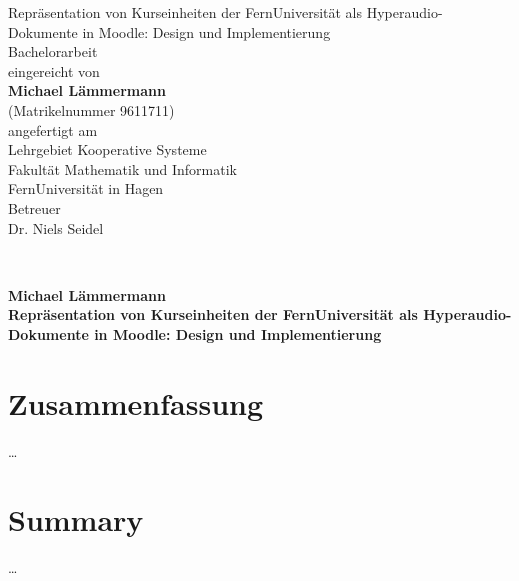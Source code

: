 \documentclass[twoside,bibliography=totoc,openany]{fumi}
\title{\thesistitle}
\author{\thesisauthor}
\date{\today}
\newcommand{\thesistitle}{Repräsentation von Kurseinheiten der FernUniversität als Hyperaudio-Dokumente in Moodle: Design und Implementierung}
\newcommand{\thesisauthor}{Michael Lämmermann}
\newcommand{\thesistype}{Bachelorarbeit} %
\newcommand{\thesismatrikelnummer}{9611711}
\begin{document}
\sffamily
\pagestyle{empty}




\vspace{2cm}
\begin{center}\LARGE
\vfill
{\Huge\thesistitle}\\
\vfill
\thesistype\\
\vfill
eingereicht von\\[4pt]
\textbf{\thesisauthor}\\[4pt]
(Matrikelnummer \thesismatrikelnummer)\\
\vfill
angefertigt am\\
Lehrgebiet Kooperative Systeme\\
Fakultät Mathematik und Informatik\\
FernUniversität in Hagen\\
\vfill 
Betreuer\\
Dr. Niels Seidel
\vfill
\monthname[\the\month] \the\year
\end{center}
\newpage~\newpage

{\large\textbf{\thesisauthor}\\\textbf{\thesistitle}\vfill}\newpage~\newpage


\section*{Zusammenfassung}
\dots\vfill
\section*{Summary}
\dots\vfill\newpage
\end{document}
